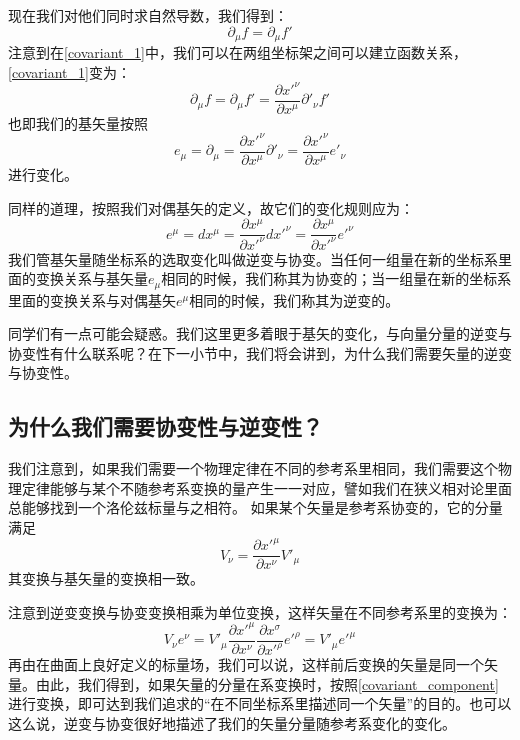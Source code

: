 \documentclass[UTF-8]{article}
\begin{document}
现在我们对他们同时求自然导数，我们得到：
\begin{equation}
	\partial_{\mu} f = \partial_{\mu} f'
	\label{covariant_1}
\end{equation}
注意到在\ref{covariant_1}中，我们可以在两组坐标架之间可以建立函数关系，\ref{covariant_1}变为：
\begin{equation}
	\partial_{\mu} f = \partial_{\mu} f' = \frac{\partial x'^{\nu}}{\partial x^{\mu}} \partial'_{\nu} f'
\end{equation}
也即我们的基矢量按照
\begin{equation}
	e_{\mu} = \partial_{\mu} = \frac{\partial x'^{\nu}}{\partial x^{\mu}} \partial'_{\nu} = \frac{\partial x'^{\nu}}{\partial x^{\mu}} e'_{\nu}
\end{equation}
进行变化。


同样的道理，按照我们对偶基矢的定义，故它们的变化规则应为：
\begin{equation}
	e^{\mu} = dx^{\mu} = \frac{\partial x^{\mu}}{\partial x'^{\nu}} dx'^{\nu} = \frac{\partial x^{\mu}}{\partial x'^{\nu}} e'^{\nu}
\end{equation}
我们管基矢量随坐标系的选取变化叫做逆变与协变。当任何一组量在新的坐标系里面的变换关系与基矢量$e_{\mu}$相同的时候，我们称其为协变的；当一组量在新的坐标系里面的变换关系与对偶基矢$e^{\mu}$相同的时候，我们称其为逆变的。

同学们有一点可能会疑惑。我们这里更多着眼于基矢的变化，与向量分量的逆变与协变性有什么联系呢？在下一小节中，我们将会讲到，为什么我们需要矢量的逆变与协变性。

\subsection{为什么我们需要协变性与逆变性？}
我们注意到，如果我们需要一个物理定律在不同的参考系里相同，我们需要这个物理定律能够与某个不随参考系变换的量产生一一对应，譬如我们在狭义相对论里面总能够找到一个洛伦兹标量与之相符。
如果某个矢量是参考系协变的，它的分量满足
\begin{equation}
	V_{\nu} = \frac{\partial x'^{\mu}}{\partial x^{\nu}} V'_{\mu}
	\label{covariant_component}
\end{equation}
其变换与基矢量的变换相一致。

注意到逆变变换与协变变换相乘为单位变换，这样矢量在不同参考系里的变换为：
\begin{equation}
	V_{\nu} e^{\nu} = V'_{\mu} \frac{\partial x'^{\mu}}{\partial x^{\nu}} \frac{\partial x^{\sigma}}{\partial x'^{\rho}} e'^{\rho} = V'_{\mu} e'^{\mu}
\end{equation}
再由在曲面上良好定义的标量场，我们可以说，这样前后变换的矢量是同一个矢量。由此，我们得到，如果矢量的分量在系变换时，按照\ref{covariant_component}进行变换，即可达到我们追求的“在不同坐标系里描述同一个矢量”的目的。也可以这么说，逆变与协变很好地描述了我们的矢量分量随参考系变化的变化。
\end{document}
